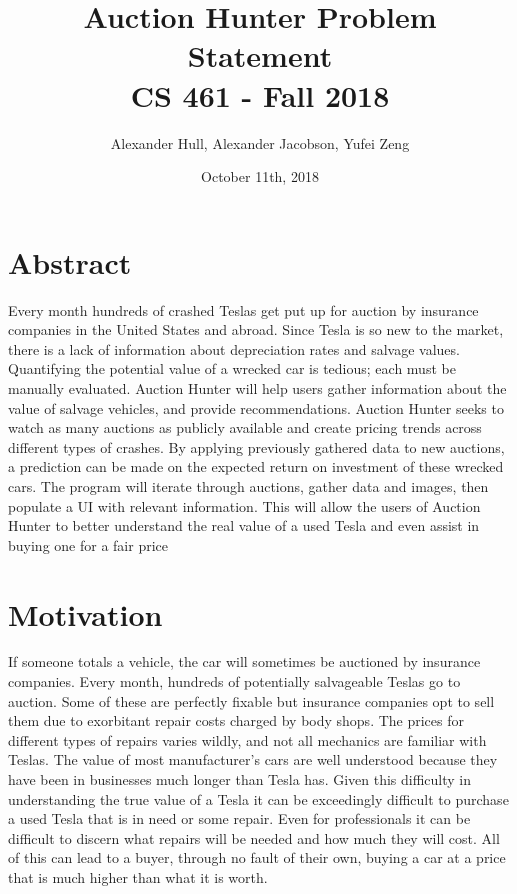 \documentclass[draftclsnofoot,onecolumn,10pt]{IEEEtran}
\title{Auction Hunter Problem Statement\\CS 461 - Fall 2018}
\author{Alexander Hull, Alexander Jacobson, Yufei Zeng}
\date{October 11th, 2018}
\begin{document}
\maketitle

\singlespacing

\section{Abstract}

Every month hundreds of crashed Teslas get put up for auction by insurance companies in the United States and abroad. Since Tesla is so new to the market, there is a lack of information about depreciation rates and salvage values. Quantifying the potential value of a wrecked car is tedious; each must be manually evaluated. Auction Hunter will help users gather information about the value of salvage vehicles, and provide recommendations. Auction Hunter seeks to watch as many auctions as publicly available and create pricing trends across different types of crashes. By applying previously gathered data to new auctions, a prediction can be made on the expected return on investment of these wrecked cars. The program will iterate through auctions, gather data and images, then populate a UI with relevant information. This will allow the users of Auction Hunter to better understand the real value of a used Tesla and even assist in buying one for a fair price

\newpage



\section{Motivation}
If someone totals a vehicle, the car will sometimes be auctioned by insurance companies. Every month, hundreds of potentially salvageable Teslas go to auction. Some of these are perfectly fixable but insurance companies opt to sell them due to exorbitant repair costs charged by body shops. The prices for different types of repairs varies wildly, and not all mechanics are familiar with Teslas. The value of most manufacturer's cars are well understood because they have been in businesses much longer than Tesla has. Given this difficulty in understanding the true value of a Tesla it can be exceedingly difficult to purchase a used Tesla that is in need or some repair. Even for professionals it can be difficult to discern what repairs will be needed and how much they will cost. All of this can lead to a buyer, through no fault of their own, buying a car at a price that is much higher than what it is worth.
\end{document}
